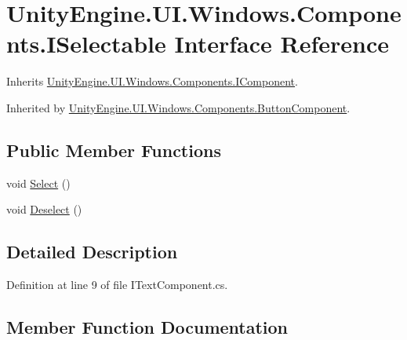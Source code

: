\hypertarget{interface_unity_engine_1_1_u_i_1_1_windows_1_1_components_1_1_i_selectable}{}\section{Unity\+Engine.\+U\+I.\+Windows.\+Components.\+I\+Selectable Interface Reference}
\label{interface_unity_engine_1_1_u_i_1_1_windows_1_1_components_1_1_i_selectable}


Inherits \hyperlink{interface_unity_engine_1_1_u_i_1_1_windows_1_1_components_1_1_i_component}{Unity\+Engine.\+U\+I.\+Windows.\+Components.\+I\+Component}.



Inherited by \hyperlink{class_unity_engine_1_1_u_i_1_1_windows_1_1_components_1_1_button_component}{Unity\+Engine.\+U\+I.\+Windows.\+Components.\+Button\+Component}.

\subsection*{Public Member Functions}
\begin{DoxyCompactItemize}
\item 
void \hyperlink{interface_unity_engine_1_1_u_i_1_1_windows_1_1_components_1_1_i_selectable_aa9b93538c2920bc16350da1e5e327916}{Select} ()
\item 
void \hyperlink{interface_unity_engine_1_1_u_i_1_1_windows_1_1_components_1_1_i_selectable_a9823f3914e9abdd2680c35e42909ec62}{Deselect} ()
\end{DoxyCompactItemize}


\subsection{Detailed Description}


Definition at line 9 of file I\+Text\+Component.\+cs.



\subsection{Member Function Documentation}
\hypertarget{interface_unity_engine_1_1_u_i_1_1_windows_1_1_components_1_1_i_selectable_a9823f3914e9abdd2680c35e42909ec62}{}
